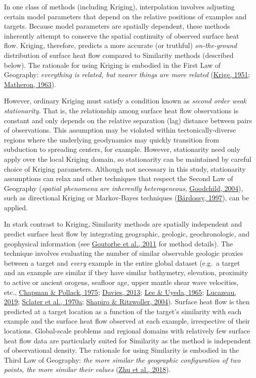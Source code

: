 In one class of methods (including Kriging), interpolation involves adjusting certain model parameters that depend on the relative positions of examples and targets. Because model parameters are spatially dependent, these methods inherently attempt to conserve the spatial continuity of observed surface heat flow. Kriging, therefore, predicts a more accurate (or truthful) \emph{on-the-ground} distribution of surface heat flow compared to Similarity methods (described below). The rationale for using Kriging is embodied in the First Law of Geography: \emph{everything is related, but nearer things are more related} (\protect\hyperlink{ref-krige1951}{Krige, 1951}; \protect\hyperlink{ref-matheron1963}{Matheron, 1963}).

However, ordinary Kriging must satisfy a condition known as \emph{second order weak stationarity}. That is, the relationship among surface heat flow observations is constant and only depends on the relative separation (lag) distance between pairs of observations. This assumption may be violated within tectonically-diverse regions where the underlying geodynamics may quickly transition from subduction to spreading centers, for example. However, stationarity need only apply over the local Kriging domain, so stationarity can be maintained by careful choice of Kriging parameters. Although not necessary in this study, stationarity assumptions can relax and other techniques that respect the Second Law of Geography (\emph{spatial phenomena are inherently heterogeneous}, \protect\hyperlink{ref-goodchild2004}{Goodchild, 2004}), such as directional Kriging or Markov-Bayes techniques (\protect\hyperlink{ref-bardossy1997}{Bárdossy, 1997}), can be applied.

In stark contrast to Kriging, Similarity methods are spatially independent and predict surface heat flow by integrating geographic, geologic, geochronologic, and geophysical information (see \protect\hyperlink{ref-goutorbe2011}{Goutorbe et al., 2011} for method details). The technique involves evaluating the number of similar observable geologic proxies between a target and \emph{every} example in the entire global dataset (e.g.~a target and an example are similar if they have similar bathymetry, elevation, proximity to active or ancient orogens, seafloor age, upper mantle shear wave velocities, etc., \protect\hyperlink{ref-chapman1975}{Chapman \& Pollack, 1975}; \protect\hyperlink{ref-davies2013}{Davies, 2013}; \protect\hyperlink{ref-lee1965}{Lee \& Uyeda, 1965}; \protect\hyperlink{ref-lucazeau2019}{Lucazeau, 2019}; \protect\hyperlink{ref-sclater1970}{Sclater et al., 1970a}; \protect\hyperlink{ref-shapiro2004}{Shapiro \& Ritzwoller, 2004}). Surface heat flow is then predicted at a target location as a function of the target's similarity with each example and the surface heat flow observed at each example, irrespective of their locations. Global-scale problems and regional domains with relatively few surface heat flow data are particularly suited for Similarity as the method is independent of observational density. The rationale for using Similarity is embodied in the Third Law of Geography: \emph{the more similar the geographic configuration of two points, the more similar their values} (\protect\hyperlink{ref-zhu2018}{Zhu et al., 2018}).


